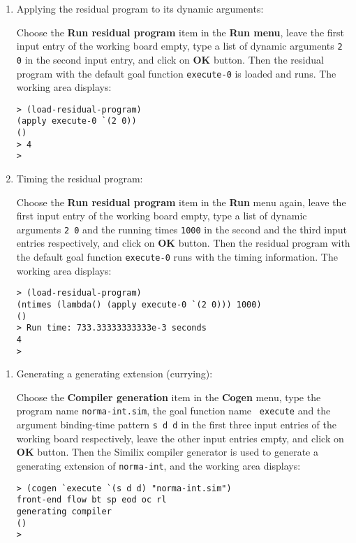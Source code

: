 \begin{sloppypar}
\begin{enumerate}
\item Applying the residual program to its dynamic arguments:

    Choose the {\bf Run residual program} item in the {\bf Run menu},
leave the first input entry of the working board empty, type a list of
dynamic arguments {\tt 2 0} in the second input entry, and click on
{\bf OK} button. Then the residual program with the default goal
function {\tt execute-0} is loaded and runs. The working area
displays:

\begin{verbatim}
> (load-residual-program)
(apply execute-0 `(2 0))
()
> 4
>
\end{verbatim}

\item Timing the residual program:

    Choose the {\bf Run residual program} item in the {\bf Run} menu
again, leave the first input entry of the working board empty, type a
list of dynamic arguments {\tt 2 0} and the running times {\tt 1000}
in the second and the third input entries respectively, and click on
{\bf OK} button.  Then the residual program with the default goal
function {\tt execute-0} runs with the timing information. The working
area displays:

\begin{verbatim}
> (load-residual-program)
(ntimes (lambda() (apply execute-0 `(2 0))) 1000)
()
> Run time: 733.33333333333e-3 seconds
4
>
\end{verbatim}
\end{enumerate}

\begin{enumerate}
\item Generating a generating extension (currying):

    Choose the {\bf Compiler generation} item in the {\bf Cogen} menu,
type the program name {\tt norma-int.sim}, the goal function name {\tt
execute} and the argument binding-time pattern {\tt s d d} in the
first three input entries of the working board respectively, leave the
other input entries empty, and click on {\bf OK} button.  Then the
Similix compiler generator is used to generate a generating extension
of {\tt norma-int}, and the working area displays:

\begin{verbatim}
> (cogen `execute `(s d d) "norma-int.sim")
front-end flow bt sp eod oc rl
generating compiler
()
>
\end{verbatim}


\end{enumerate}
\end{sloppypar}
